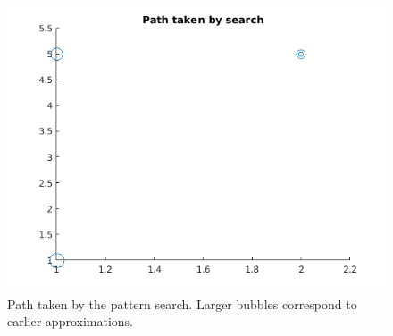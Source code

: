 \documentclass{article}
\begin{document}
\begin{figure}
	\centering
	\includegraphics[width=0.75\linewidth]{path-taken-by-search}
	\caption{Path taken by the pattern search. Larger bubbles correspond to earlier approximations.}
	\label{fig:path}
\end{figure}
\end{document}
